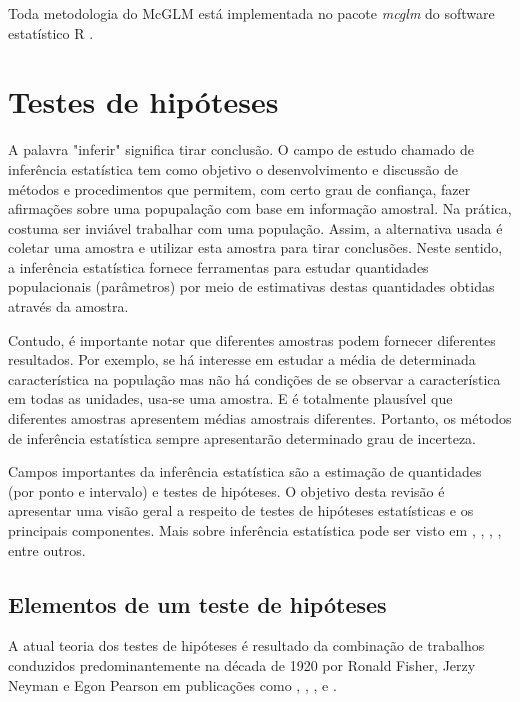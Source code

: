 Toda metodologia do McGLM está implementada no pacote \emph{mcglm} \citep{mcglm} do software estatístico R \citep{softwareR}.

\section{Testes de hipóteses}

A palavra "inferir" significa tirar conclusão. O campo de estudo chamado de inferência estatística tem como objetivo o desenvolvimento e discussão de métodos e procedimentos que permitem, com certo grau de confiança, fazer afirmações sobre uma popupalação com base em informação amostral. Na prática, costuma ser inviável trabalhar com uma população. Assim, a alternativa usada é coletar uma amostra e utilizar esta amostra para tirar conclusões. Neste sentido, a inferência estatística fornece ferramentas para estudar quantidades populacionais (parâmetros) por meio de estimativas destas quantidades obtidas através da amostra.

Contudo, é importante notar que diferentes amostras podem fornecer diferentes resultados. Por exemplo, se há interesse em estudar a média de determinada característica na população mas não há condições de se observar a característica em todas as unidades, usa-se uma amostra. E é totalmente plausível que diferentes amostras apresentem médias amostrais diferentes. Portanto, os métodos de inferência estatística sempre apresentarão determinado grau de incerteza. 

Campos importantes da inferência estatística são a estimação de quantidades (por ponto e intervalo) e testes de hipóteses. O objetivo desta revisão é apresentar uma visão geral a respeito de testes de hipóteses estatísticas e os principais componentes. Mais sobre inferência estatística pode ser visto em \citet{barndorff2017}, \citet{silvey2017}, \citet{azzalini2017}, \citet{wasserman2013all}, entre outros.

\subsection{Elementos de um teste de hipóteses}

A atual teoria dos testes de hipóteses é resultado da combinação de  trabalhos conduzidos predominantemente na década de 1920 por Ronald Fisher, Jerzy Neyman e Egon Pearson em publicações como \citet{fisherarrangement}, \citet{fisher1929}, \citet{neyman2020use1}, \citet{neyman2020use2} e \citet{neyman1933ix}. 


